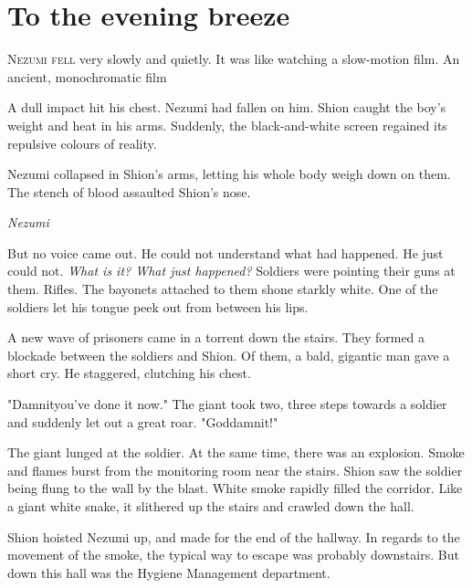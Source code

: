 
\chapter{To the evening breeze}


\lettrine{N}{ezumi fell} very slowly and quietly. It was like watching a slow-motion
film. An ancient, monochromatic film\el 

A dull impact hit his chest. Nezumi had fallen on him. Shion caught the
boy's weight and heat in his arms. Suddenly, the black-and-white screen
regained its repulsive colours of reality.

Nezumi collapsed in Shion's arms, letting his whole body weigh down on
them. The stench of blood assaulted Shion's nose.

\emph{Nezumi\el }

But no voice came out. He could not understand what had happened. He
just could not. \emph{What is it? What just happened?} Soldiers were pointing
their guns at them. Rifles. The bayonets attached to them shone starkly
white. One of the soldiers let his tongue peek out from between his
lips.

A new wave of prisoners came in a torrent down the stairs. They formed a
blockade between the soldiers and Shion. Of them, a bald, gigantic man
gave a short cry. He staggered, clutching his chest.

"Damnit\el you've done it now." The giant took two, three steps towards
a soldier and suddenly let out a great roar. "Goddamnit!"

The giant lunged at the soldier. At the same time, there was an
explosion. Smoke and flames burst from the monitoring room near the
stairs. Shion saw the soldier being flung to the wall by the blast.
White smoke rapidly filled the corridor. Like a giant white snake, it
slithered up the stairs and crawled down the hall.

Shion hoisted Nezumi up, and made for the end of the hallway. In regards
to the movement of the smoke, the typical way to escape was probably
downstairs. But down this hall was the Hygiene Management department.

